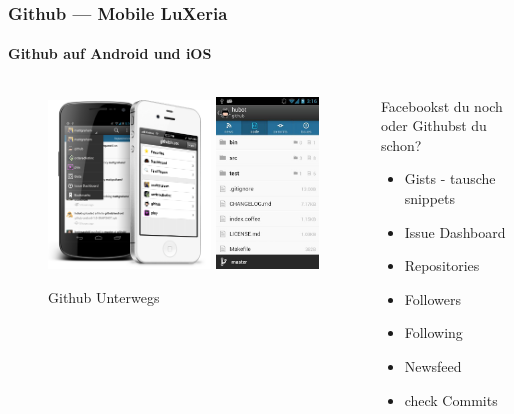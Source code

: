 \begin{frame}
    \frametitle{Github --- Mobile \hfill{} \footnotesize{LuXeria}}
    \framesubtitle{Github auf Android und iOS}
    \begin{columns}
        \begin{column}{5cm}
            \begin{figure}
                \includegraphics[width=0.6\textwidth]{github_mobile2.png}
                \includegraphics[width=0.38\textwidth]{github_mobile.jpg}
                \caption{Github Unterwegs}
            \end{figure}
        \end{column}
        \begin{column}{5cm}
            \begin{block}{Facebookst du noch oder Githubst du schon?}
                \begin{itemize}
                    \item Gists - tausche snippets
                    \item Issue Dashboard
                    \item Repositories
                    \item Followers
                    \item Following
                    \item Newsfeed
                    \item check Commits
                \end{itemize}
            \end{block}
        \end{column}
    \end{columns}
\end{frame}
